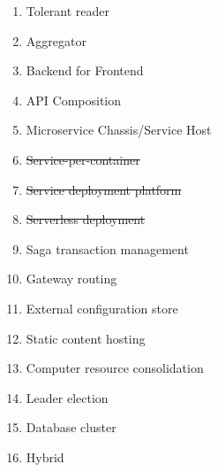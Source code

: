 \documentclass{article}
\theoremstyle{mytheoremstyle}
\theoremstyle{mytheoremstyle}
\theoremstyle{myproblemstyle}
\begin{document}
\begin{enumerate}
  \item Tolerant reader 
  \item Aggregator 
  \item Backend for Frontend 
  \item API Composition 
  \item Microservice Chassis/Service Host   
  \item \sout{Service-per-container}
  \item \sout{Service deployment platform}
  \item \sout{Serverless deployment} 
  \item Saga transaction management
  \item Gateway routing 
  \item External configuration store 
  \item Static content hosting 
  \item Computer resource consolidation 
  \item Leader election 
  \item Database cluster
  \item Hybrid
\end{enumerate}
\end{document}
